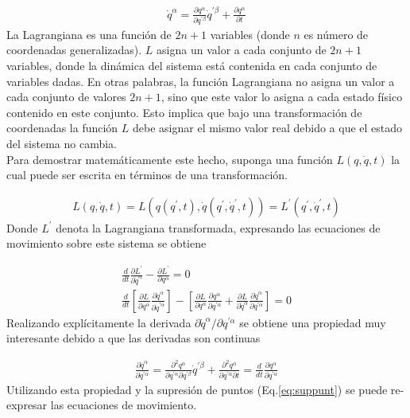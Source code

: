 \begin{gather*}
    \dot{q}^{\alpha} = \frac{\partial q^{\alpha}}{\partial q^{\prime \beta}}\dot{q}^{\prime \beta} + \frac{\partial q^{\alpha}}{\partial t}
\end{gather*}
La Lagrangiana es una función de $2n + 1$ variables (donde $n$ es número de coordenadas generalizadas). $L$ asigna un valor a cada conjunto de $2n + 1$ variables, donde la dinámica del sistema está contenida en cada conjunto de variables dadas. En otras palabras, la función Lagrangiana no asigna un valor a cada conjunto de valores $2n + 1$, sino que este valor lo asigna a cada estado físico contenido en este conjunto. Esto implica que bajo una transformación de coordenadas la función $L$ debe asignar el mismo valor real debido a que el estado del sistema no cambia.\newline\\
Para demostrar matemáticamente este hecho, suponga una función $L(q,\dot{q},t)$ la cual puede ser escrita en términos de una transformación.

\begin{gather*}
    L(q,\dot{q},t) = L(q(q^{\prime},t),\dot{q}(q^{\prime},\dot{q}^{\prime},t)) = L^{\prime}(q^{\prime},\dot{q}^{\prime},t)
\end{gather*}
Donde $L^{\prime}$ denota la Lagrangiana transformada, expresando las ecuaciones de movimiento sobre este sistema se obtiene

\begin{gather*}
    \frac{d}{dt}\frac{\partial L^{\prime}}{\partial \dot{q}^{\alpha}} - \frac{\partial L^{\prime}}{\partial q^{\alpha}} = 0\\
    \frac{d}{dt}\left[\frac{\partial L}{\partial \dot{q^{\alpha}}}\frac{\partial \dot{q}^{\alpha}}{\partial \dot{q}^{\prime\alpha}}\right] - \left[\frac{\partial L}{\partial q^{\alpha}}\frac{\partial q^{\alpha}}{\partial q^{\prime\alpha}} + \frac{\partial L}{\partial \dot{q}^{\alpha}}\frac{\partial \dot{q}^{\alpha}}{\partial q^{\prime\alpha}}\right] = 0
\end{gather*}
Realizando explícitamente la derivada $\partial \dot{q}^{\alpha}/\partial q^{\prime\alpha}$ se obtiene una propiedad muy interesante debido a que las derivadas son continuas

\begin{gather}
    \label{eq:prop}\frac{\partial \dot{q}^{\alpha}}{\partial q^{\prime\alpha}} = \frac{\partial^2q^{\alpha}}{\partial q^{\prime\alpha}\partial q^{\prime \beta}}\dot{q}^{\prime \beta} + \frac{\partial^2 q^{\alpha}}{\partial q^{\prime\alpha}\partial t} = \frac{d}{dt}\frac{\partial q^{\alpha}}{\partial q^{\prime\alpha}}
\end{gather}
Utilizando esta propiedad y la supresión de puntos (Eq.\ref*{eq:suppunt}) se puede re-expresar las ecuaciones de movimiento.

